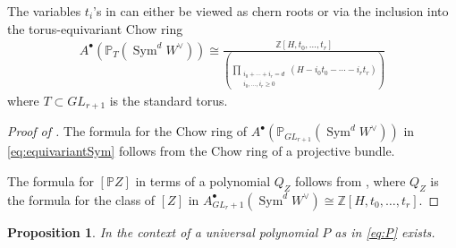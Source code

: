 \documentclass[12 pt]{amsart}
\newtheorem{proposition}{Proposition}[section]
\newcommand{\<}{\left\langle}
\renewcommand{\>}{\right\rangle}
\begin{document}
The variables $t_i$'s in  can either be viewed as chern roots or via the inclusion into the torus-equivariant Chow ring 
\begin{align*}
    A^{\bullet}(\mathbb{P}_{T}(\operatorname{Sym}^d W^{\vee}))\cong \frac{\mathbb{Z}[H, t_0,\ldots,t_{r}]}{\left(\displaystyle\prod_{\substack{i_0+\cdots+i_{r}=d\\ i_0,\ldots,i_r\geq 0}}(H-i_0 t_0 - \cdots - i_r t_r)\right)}
\end{align*}
where $T\subset GL_{r+1}$ is the standard torus.

\begin{proof}[Proof of ]
The formula for the Chow ring of $A^{\bullet}(\mathbb{P}_{GL_{r+1}}(\operatorname{Sym}^d W^{\vee}))$ in \eqref{eq:equivariantSym} follows from the Chow ring of a projective bundle. %

The formula for $[\mathbb{P}Z]$ in terms of a polynomial $Q_Z$ follows from \cite[Theorem 6.1]{FNR05}, where $Q_Z$ is the formula for the class of $[Z]$ in $A^{\bullet}_{GL_r+1}(\operatorname{Sym}^d W^{\vee})\cong \mathbb{Z}[H, t_0,\ldots,t_{r}]$. 
\end{proof}

\begin{proposition}
In the context of  a universal polynomial $P$ as in \eqref{eq:P} exists.
\end{proposition}
\end{document}
